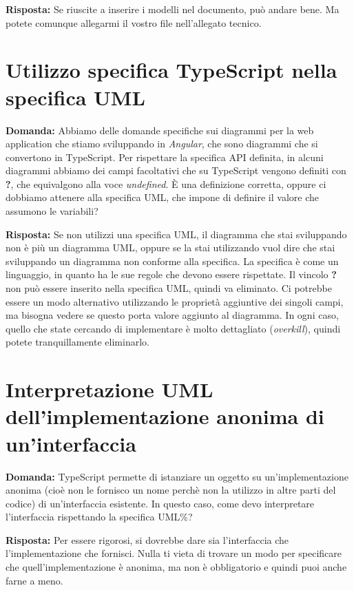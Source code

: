 \documentclass{article}
\begin{document}
\textbf{Risposta:} Se riuscite a inserire i modelli nel documento, può andare bene. Ma potete comunque allegarmi il vostro file nell'allegato tecnico.

\section{Utilizzo specifica TypeScript nella specifica UML}%
\label{sec:utilizzo_specifica_typescript_in_specifica_uml}

\textbf{Domanda:} Abbiamo delle domande specifiche sui diagrammi per la web application che stiamo sviluppando in \textit{Angular}, che sono diagrammi che si convertono in TypeScript. Per rispettare la specifica API definita, in alcuni diagrammi abbiamo dei campi facoltativi che su TypeScript vengono definiti con \textbf{?}, che equivalgono alla voce \textit{undefined}. È una definizione corretta, oppure ci dobbiamo attenere alla specifica UML, che impone di definire il valore che assumono le variabili?

\textbf{Risposta:} Se non utilizzi una specifica UML, il diagramma che stai sviluppando non è più un diagramma UML, oppure se la stai utilizzando vuol dire che stai sviluppando un diagramma non conforme alla specifica. La specifica è come un linguaggio, in quanto ha le sue regole che devono essere rispettate. Il vincolo \textbf{?} non può essere inserito nella specifica UML, quindi va eliminato. Ci potrebbe essere un modo alternativo utilizzando le proprietà aggiuntive dei singoli campi, ma bisogna vedere se questo porta valore aggiunto al diagramma. In ogni caso, quello che state cercando di implementare è molto dettagliato (\textit{overkill}), quindi potete tranquillamente eliminarlo.

\section{Interpretazione UML dell'implementazione anonima di un'interfaccia}%
\label{sec:Interpretazione_uml_implementazione_anonima_interfaccia}

\textbf{Domanda:} TypeScript permette di istanziare un oggetto su un'implementazione anonima (cioè non le fornisco un nome perchè non la utilizzo in altre parti del codice) di un'interfaccia esistente. In questo caso, come devo interpretare l'interfaccia rispettando la specifica UML\%?

\textbf{Risposta:} Per essere rigorosi, si dovrebbe dare sia l'interfaccia che l'implementazione che fornisci. Nulla ti vieta di trovare un modo per specificare che quell'implementazione è anonima, ma non è obbligatorio e quindi puoi anche farne a meno.
\end{document}
